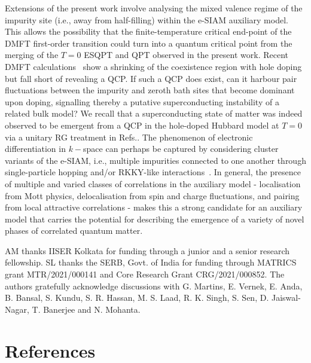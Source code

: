 \documentclass{iopart}
\begin{document}
Extensions of the present work involve analysing the mixed valence regime of the impurity site (i.e., away from half-filling) within the e-SIAM auxiliary model. This allows the possibility that the finite-temperature critical end-point of the DMFT first-order transition could turn into a quantum critical point from the merging of the $T=0$ ESQPT and QPT observed in the present work. Recent DMFT calculations~\cite{vucicevic2015} show a shrinking of the coexistence region with hole doping but fall short of revealing a QCP. If such a QCP does exist, can it harbour pair fluctuations between the impurity and zeroth bath sites that become dominant upon doping, signalling thereby a putative superconducting instability of a related bulk model? We recall that a superconducting state of matter was indeed observed to be emergent from a QCP in the hole-doped Hubbard model at $T=0$ via a unitary RG treatment in Refs.\cite{anirbanmott2,Mukherjee_mott_merg}.
The phenomenon of electronic differentiation in \(k-\)space can perhaps be captured by considering cluster variants of the e-SIAM, i.e., multiple impurities connected to one another through single-particle hopping and/or RKKY-like interactions~\cite{Ferrero2007,imada2010unconventional}.
In general, the presence of multiple and varied classes of correlations in the auxiliary model - localisation from Mott physics, delocalisation from spin and charge fluctuations, and pairing from local attractive correlations - makes this a strong candidate for an auxiliary model that carries the potential for describing the emergence of a variety of novel phases of correlated quantum matter.

\ack
AM thanks IISER Kolkata for funding through a junior and a senior research fellowship. SL thanks the SERB, Govt. of India for funding through MATRICS grant MTR/2021/000141 and Core Research Grant CRG/2021/000852. The authors gratefully acknowledge discussions with G. Martins, E. Vernek, E. Anda, B. Bansal, S. Kundu, S. R. Hassan, M. S. Laad, R. K. Singh, S. Sen, D. Jaiswal-Nagar, T. Banerjee and N. Mohanta.

\section*{References}


\end{document}
